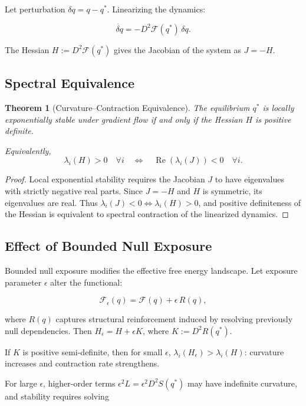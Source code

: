 \documentclass[11pt]{article}
\newtheorem{theorem}{Theorem}
\theoremstyle{remark}
\begin{document}
Let perturbation $\delta q = q - q^*$. Linearizing the dynamics:

\[
\dot{\delta q}
=
- D^2 \mathcal{F}(q^*) \, \delta q.
\]

The Hessian $H := D^2 \mathcal{F}(q^*)$ gives the Jacobian of the system as $J = -H$.

\subsection{Spectral Equivalence}

\begin{theorem}[Curvature--Contraction Equivalence]
\label{thm:curvature_contraction}
The equilibrium $q^*$ is locally exponentially stable under gradient flow if and only if the Hessian $H$ is positive definite.

Equivalently,
\[
\lambda_i(H) > 0
\quad \forall i
\quad \Longleftrightarrow \quad
\operatorname{Re}(\lambda_i(J)) < 0 \quad \forall i.
\]
\end{theorem}

\begin{proof}
Local exponential stability requires the Jacobian $J$ to have eigenvalues with strictly negative real parts. Since $J = -H$ and $H$ is symmetric, its eigenvalues are real. Thus $\lambda_i(J) < 0 \iff \lambda_i(H) > 0$, and positive definiteness of the Hessian is equivalent to spectral contraction of the linearized dynamics.
\end{proof}

\subsection{Effect of Bounded Null Exposure}

Bounded null exposure modifies the effective free energy landscape. Let exposure parameter $\epsilon$ alter the functional:

\[
\mathcal{F}_\epsilon(q)
=
\mathcal{F}(q)
+
\epsilon \, R(q),
\]

where $R(q)$ captures structural reinforcement induced by resolving previously null dependencies. Then $H_\epsilon = H + \epsilon K$, where $K := D^2 R(q^*)$.

If $K$ is positive semi-definite, then for small $\epsilon$, $\lambda_i(H_\epsilon) > \lambda_i(H)$: curvature increases and contraction rate strengthens.

For large $\epsilon$, higher-order terms $\epsilon^2 L = \epsilon^2 D^2 S(q^*)$ may have indefinite curvature, and stability requires solving
\end{document}
